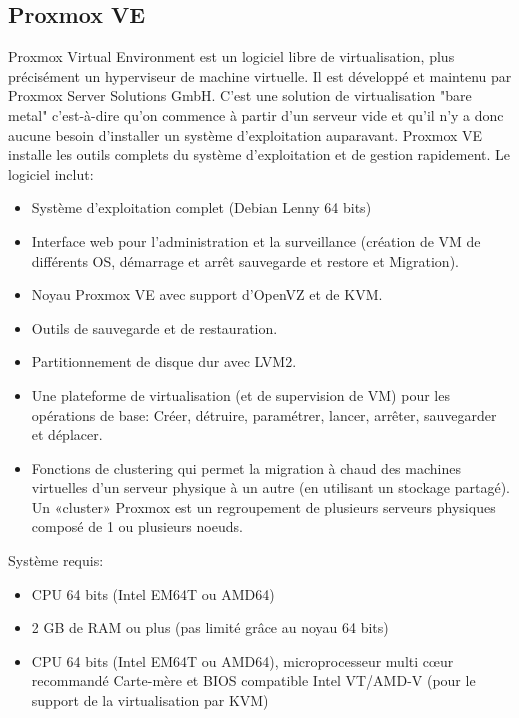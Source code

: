 \documentclass[a4paper,11pt]{report}
\begin{document}
\subsection{Proxmox VE}

Proxmox Virtual Environment est un logiciel libre de virtualisation, plus précisément un hyperviseur de machine virtuelle. Il est développé et maintenu par Proxmox Server Solutions GmbH.
C'est une solution de virtualisation "bare metal" c'est-à-dire qu'on commence à partir d'un serveur vide et qu'il n'y a donc aucune besoin d'installer un système d'exploitation auparavant.
Proxmox VE installe les outils complets du système d'exploitation et de gestion rapidement.
Le logiciel inclut:
\begin{itemize}
  \item Système d'exploitation complet (Debian Lenny 64 bits)
  \item Interface web pour l'administration et la surveillance (création de VM de différents OS, démarrage et arrêt sauvegarde et restore et Migration).
  \item Noyau Proxmox VE avec support d'OpenVZ et de KVM.
  \item Outils de sauvegarde et de restauration.
  \item Partitionnement de disque dur avec LVM2.
  \item Une plateforme de virtualisation (et de 
supervision de VM) pour les opérations de base: Créer, détruire, paramétrer, lancer, arrêter, sauvegarder et déplacer.
  \item Fonctions de clustering qui permet la migration à chaud des machines virtuelles d'un serveur physique à un autre (en utilisant un stockage partagé).
Un «cluster» Proxmox est un regroupement de plusieurs serveurs physiques composé de 1 ou plusieurs noeuds.
\end{itemize}

Système requis:
\begin{itemize}
   \item CPU 64 bits (Intel EM64T ou AMD64)
   \item 2 GB de RAM ou plus (pas limité grâce au noyau 64 bits)
   \item CPU 64 bits (Intel EM64T ou AMD64), microprocesseur multi cœur recommandé
Carte-mère et BIOS compatible Intel VT/AMD-V (pour le support de la virtualisation par KVM)
\end{itemize}
\end{document}
